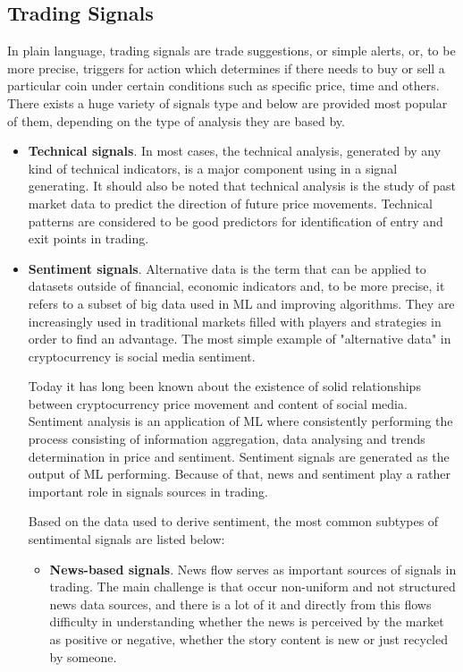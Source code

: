 \documentclass[thesis=B,english]{FITthesis}[2019/03/06]
\begin{document}
\subsection{Trading Signals}
In plain language, trading signals are trade suggestions, or simple alerts, or, to be more precise, triggers for action which determines if there needs to buy or sell a particular coin under certain conditions such as specific price, time and others. There exists a huge variety of signals type and below are provided most popular of them, depending on the type of analysis they are based by.
\begin{itemize}
\item 
\textbf{Technical signals}. In most cases,  the technical analysis, generated by any kind of technical indicators, is a major component using in a signal generating. It should also be noted that technical analysis is the study of past market data to predict the direction of future price movements. Technical patterns are considered to be good predictors for identification of entry and exit points in trading. 


\item 
\textbf{Sentiment signals}. Alternative data is the term that can be applied to datasets outside of financial, economic indicators and, to be more precise, it refers to a subset of big data used in ML\footnotemark {} and improving algorithms. They are increasingly used in traditional markets filled with players and strategies in order to find an advantage. The most simple example of "alternative data" in cryptocurrency is social media sentiment.

Today it has long been known about the existence of solid relationships between cryptocurrency price movement and content of social media. Sentiment analysis is an application of ML where consistently performing the process consisting of information aggregation, data analysing and trends determination in price and sentiment. Sentiment signals are generated as the output of ML performing. Because of that, news and sentiment play a rather important role in signals sources in trading.  


Based on the data used to derive sentiment, the most common subtypes of sentimental signals are listed below:


\begin{itemize}
\item
\textbf{News-based signals}. News flow serves as important sources of signals in trading. The main challenge is that occur non-uniform and not structured news data sources, and there is a lot of it and directly from this flows difficulty in understanding whether the news is perceived by the market as positive or negative, whether the story content is new or just recycled by someone.


\end{itemize}
\end{itemize}
\end{document}
